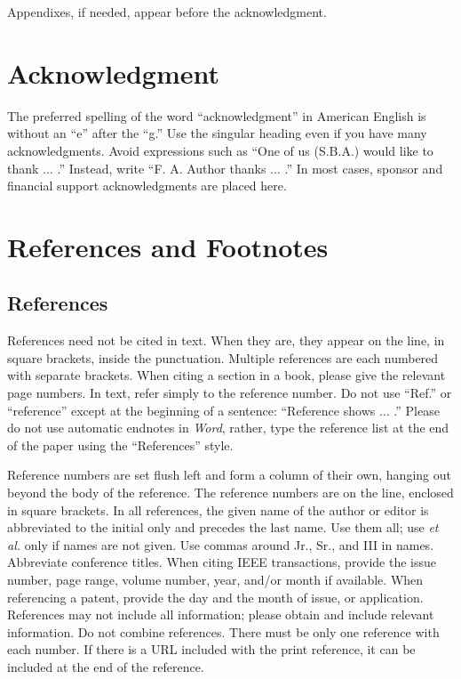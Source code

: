 \documentclass{ieeeaccess}
\begin{document}
Appendixes, if needed, appear before the acknowledgment.

\section*{Acknowledgment}

The preferred spelling of the word ``acknowledgment'' in American English is
without an ``e'' after the ``g.'' Use the singular heading even if you have
many acknowledgments. Avoid expressions such as ``One of us (S.B.A.) would
like to thank $\ldots$ .'' Instead, write ``F. A. Author thanks $\ldots$ .'' In most
cases, sponsor and financial support acknowledgments are placed here.

\section*{References and Footnotes}

\subsection{References}
References need not be cited in text. When they are, they appear on the
line, in square brackets, inside the punctuation. Multiple references are
each numbered with separate brackets. When citing a section in a book,
please give the relevant page numbers. In text, refer simply to the
reference number. Do not use ``Ref.'' or ``reference'' except at the
beginning of a sentence: ``Reference \cite{b3} shows $\ldots$ .'' Please do not use
automatic endnotes in \emph{Word}, rather, type the reference list at the end of the
paper using the ``References'' style.

Reference numbers are set flush left and form a column of their own, hanging
out beyond the body of the reference. The reference numbers are on the line,
enclosed in square brackets. In all references, the given name of the author
or editor is abbreviated to the initial only and precedes the last name. Use
them all; use \emph{et al.} only if names are not given. Use commas around Jr.,
Sr., and III in names. Abbreviate conference titles. When citing IEEE
transactions, provide the issue number, page range, volume number, year,
and/or month if available. When referencing a patent, provide the day and
the month of issue, or application. References may not include all
information; please obtain and include relevant information. Do not combine
references. There must be only one reference with each number. If there is a
URL included with the print reference, it can be included at the end of the
reference.
\end{document}
